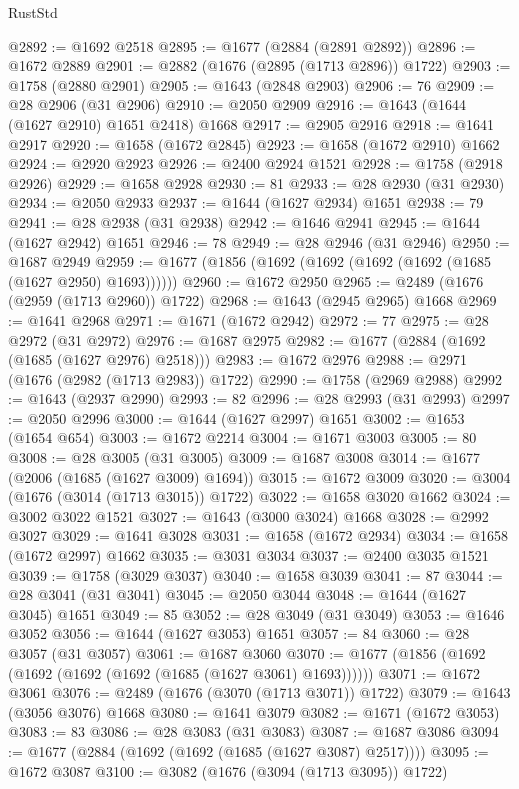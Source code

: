 \begin{lexlean}{RustStd}
\begin{coremodule}
@2892 := @1692 @2518
@2895 := @1677 (@2884 (@2891 @2892))
@2896 := @1672 @2889
@2901 := @2882 (@1676 (@2895 (@1713 @2896)) @1722)
@2903 := @1758 (@2880 @2901)
@2905 := @1643 (@2848 @2903)
@2906 := 76
@2909 := @28 @2906 (@31 @2906)
@2910 := @2050 @2909
@2916 := @1643 (@1644 (@1627 @2910) @1651 @2418) @1668
@2917 := @2905 @2916
@2918 := @1641 @2917
@2920 := @1658 (@1672 @2845)
@2923 := @1658 (@1672 @2910) @1662
@2924 := @2920 @2923
@2926 := @2400 @2924 @1521
@2928 := @1758 (@2918 @2926)
@2929 := @1658 @2928
@2930 := 81
@2933 := @28 @2930 (@31 @2930)
@2934 := @2050 @2933
@2937 := @1644 (@1627 @2934) @1651
@2938 := 79
@2941 := @28 @2938 (@31 @2938)
@2942 := @1646 @2941
@2945 := @1644 (@1627 @2942) @1651
@2946 := 78
@2949 := @28 @2946 (@31 @2946)
@2950 := @1687 @2949
@2959 := @1677 (@1856 (@1692 (@1692 (@1692 (@1692 (@1685 (@1627 @2950) @1693))))))
@2960 := @1672 @2950
@2965 := @2489 (@1676 (@2959 (@1713 @2960)) @1722)
@2968 := @1643 (@2945 @2965) @1668
@2969 := @1641 @2968
@2971 := @1671 (@1672 @2942)
@2972 := 77
@2975 := @28 @2972 (@31 @2972)
@2976 := @1687 @2975
@2982 := @1677 (@2884 (@1692 (@1685 (@1627 @2976) @2518)))
@2983 := @1672 @2976
@2988 := @2971 (@1676 (@2982 (@1713 @2983)) @1722)
@2990 := @1758 (@2969 @2988)
@2992 := @1643 (@2937 @2990)
@2993 := 82
@2996 := @28 @2993 (@31 @2993)
@2997 := @2050 @2996
@3000 := @1644 (@1627 @2997) @1651
@3002 := @1653 (@1654 @654)
@3003 := @1672 @2214
@3004 := @1671 @3003
@3005 := 80
@3008 := @28 @3005 (@31 @3005)
@3009 := @1687 @3008
@3014 := @1677 (@2006 (@1685 (@1627 @3009) @1694))
@3015 := @1672 @3009
@3020 := @3004 (@1676 (@3014 (@1713 @3015)) @1722)
@3022 := @1658 @3020 @1662
@3024 := @3002 @3022 @1521
@3027 := @1643 (@3000 @3024) @1668
@3028 := @2992 @3027
@3029 := @1641 @3028
@3031 := @1658 (@1672 @2934)
@3034 := @1658 (@1672 @2997) @1662
@3035 := @3031 @3034
@3037 := @2400 @3035 @1521
@3039 := @1758 (@3029 @3037)
@3040 := @1658 @3039
@3041 := 87
@3044 := @28 @3041 (@31 @3041)
@3045 := @2050 @3044
@3048 := @1644 (@1627 @3045) @1651
@3049 := 85
@3052 := @28 @3049 (@31 @3049)
@3053 := @1646 @3052
@3056 := @1644 (@1627 @3053) @1651
@3057 := 84
@3060 := @28 @3057 (@31 @3057)
@3061 := @1687 @3060
@3070 := @1677 (@1856 (@1692 (@1692 (@1692 (@1692 (@1685 (@1627 @3061) @1693))))))
@3071 := @1672 @3061
@3076 := @2489 (@1676 (@3070 (@1713 @3071)) @1722)
@3079 := @1643 (@3056 @3076) @1668
@3080 := @1641 @3079
@3082 := @1671 (@1672 @3053)
@3083 := 83
@3086 := @28 @3083 (@31 @3083)
@3087 := @1687 @3086
@3094 := @1677 (@2884 (@1692 (@1692 (@1685 (@1627 @3087) @2517))))
@3095 := @1672 @3087
@3100 := @3082 (@1676 (@3094 (@1713 @3095)) @1722)

\end{coremodule}
\end{lexlean}
